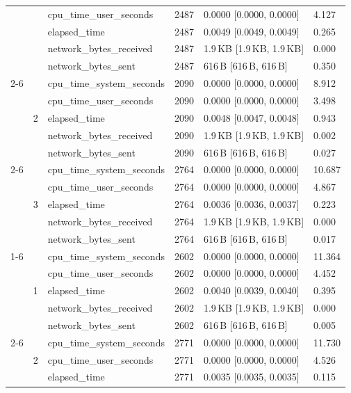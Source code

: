 \begin{tabular}{lllrll}
 &  & cpu_time_user_seconds & 2487 & 0.0000 [0.0000, 0.0000] & 4.127 \\
 &  & elapsed_time & 2487 & 0.0049 [0.0049, 0.0049] & 0.265 \\
 &  & network_bytes_received & 2487 & 1.9\,KB [1.9\,KB, 1.9\,KB] & 0.000 \\
 &  & network_bytes_sent & 2487 & 616\,B [616\,B, 616\,B] & 0.350 \\
\cline{2-6}
 & \multirow[t]{5}{*}{2} & cpu_time_system_seconds & 2090 & 0.0000 [0.0000, 0.0000] & 8.912 \\
 &  & cpu_time_user_seconds & 2090 & 0.0000 [0.0000, 0.0000] & 3.498 \\
 &  & elapsed_time & 2090 & 0.0048 [0.0047, 0.0048] & 0.943 \\
 &  & network_bytes_received & 2090 & 1.9\,KB [1.9\,KB, 1.9\,KB] & 0.002 \\
 &  & network_bytes_sent & 2090 & 616\,B [616\,B, 616\,B] & 0.027 \\
\cline{2-6}
 & \multirow[t]{5}{*}{3} & cpu_time_system_seconds & 2764 & 0.0000 [0.0000, 0.0000] & 10.687 \\
 &  & cpu_time_user_seconds & 2764 & 0.0000 [0.0000, 0.0000] & 4.867 \\
 &  & elapsed_time & 2764 & 0.0036 [0.0036, 0.0037] & 0.223 \\
 &  & network_bytes_received & 2764 & 1.9\,KB [1.9\,KB, 1.9\,KB] & 0.000 \\
 &  & network_bytes_sent & 2764 & 616\,B [616\,B, 616\,B] & 0.017 \\
\cline{1-6} \cline{2-6}
\multirow[t]{15}{*}{point-in-polygon-lookup-postgis-small} & \multirow[t]{5}{*}{1} & cpu_time_system_seconds & 2602 & 0.0000 [0.0000, 0.0000] & 11.364 \\
 &  & cpu_time_user_seconds & 2602 & 0.0000 [0.0000, 0.0000] & 4.452 \\
 &  & elapsed_time & 2602 & 0.0040 [0.0039, 0.0040] & 0.395 \\
 &  & network_bytes_received & 2602 & 1.9\,KB [1.9\,KB, 1.9\,KB] & 0.000 \\
 &  & network_bytes_sent & 2602 & 616\,B [616\,B, 616\,B] & 0.005 \\
\cline{2-6}
 & \multirow[t]{5}{*}{2} & cpu_time_system_seconds & 2771 & 0.0000 [0.0000, 0.0000] & 11.730 \\
 &  & cpu_time_user_seconds & 2771 & 0.0000 [0.0000, 0.0000] & 4.526 \\
 &  & elapsed_time & 2771 & 0.0035 [0.0035, 0.0035] & 0.115 \\

\end{tabular}
